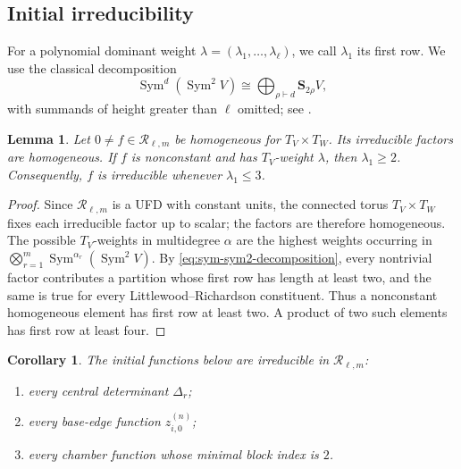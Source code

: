 \documentclass[11pt]{amsart}
\newtheorem{corollary}[theorem]{Corollary}
\newtheorem{lemma}[theorem]{Lemma}
\theoremstyle{definition}
\theoremstyle{remark}
\newcommand{\Sym}{\operatorname{Sym}}
\newcommand{\cR}{\mathcal R}
\begin{document}
\subsection{Initial irreducibility}
\label{subsec:initial-irreducibility}

For a polynomial dominant weight
$\lambda=(\lambda_1,\ldots,\lambda_\ell)$, we call $\lambda_1$ its first row.  We use
the classical decomposition
\begin{equation}
 \Sym^d(\Sym^2V)
 \cong\bigoplus_{\rho\vdash d}\mathbf S_{2\rho}V,
 \label{eq:sym-sym2-decomposition}
\end{equation}
with summands of height greater than $\ell$ omitted; see
\cite[Chapter~I, Section~5, Example~4]{Macdonald}.

\begin{lemma}\label{lem:first-row-bound}
Let $0\ne f\in\cR_{\ell,m}$ be homogeneous for $T_V\times T_W$.
Its irreducible factors are homogeneous.  If $f$ is nonconstant and has
$T_V$-weight $\lambda$, then $\lambda_1\ge2$.  Consequently, $f$ is irreducible
whenever $\lambda_1\le3$.
\end{lemma}

\begin{proof}
Since $\cR_{\ell,m}$ is a UFD with constant units, the connected torus
$T_V\times T_W$ fixes each irreducible factor up to scalar; the factors are
therefore homogeneous.  The possible $T_V$-weights in multidegree $\alpha$
are the highest weights occurring in
$\bigotimes_{r=1}^m\Sym^{\alpha_r}(\Sym^2V). $
By \eqref{eq:sym-sym2-decomposition}, every nontrivial factor contributes a
partition whose first row has length at least two, and the same is true for
every Littlewood--Richardson constituent.  Thus a nonconstant homogeneous
element has first row at least two.  A product of two such elements has
first row at least four.
\end{proof}

\begin{corollary}
\label{cor:initial-irreducibility}
The initial functions below are irreducible in $\cR_{\ell,m}$:
\begin{enumerate}
 \item every central determinant $\Delta_r$;
 \item every base-edge function $z_{i,0}^{(n)}$;
 \item every chamber function whose minimal block index is $2$.
\end{enumerate}
\end{corollary}
\end{document}
